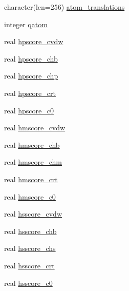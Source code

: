 \begin{DoxyCompactItemize}
\item 
character(len=256) \hyperlink{structcalc__xscore_1_1txinput_a19f91015e53fa0c0f03f9dd9274cdd1c}{atom\-\_\-translations}
\item 
integer \hyperlink{structcalc__xscore_1_1txinput_a4c517e156858f8f15f37b5fd8b74ba9d}{qatom}
\item 
real \hyperlink{structcalc__xscore_1_1txinput_a1a8aa27f6c4649199266216e3827616b}{hpscore\-\_\-cvdw}
\item 
real \hyperlink{structcalc__xscore_1_1txinput_aa4e23b9a9d6c87c204a0673091ba206a}{hpscore\-\_\-chb}
\item 
real \hyperlink{structcalc__xscore_1_1txinput_a4dac3d8d9475dad8dc2dcaa97dd34847}{hpscore\-\_\-chp}
\item 
real \hyperlink{structcalc__xscore_1_1txinput_aa3072ed2745913bfd27a72cbbc1911de}{hpscore\-\_\-crt}
\item 
real \hyperlink{structcalc__xscore_1_1txinput_a0bc75e685f1068470be54d0100b82de9}{hpscore\-\_\-c0}
\item 
real \hyperlink{structcalc__xscore_1_1txinput_ae60bf9cfc4875ca31878b1d299f978f3}{hmscore\-\_\-cvdw}
\item 
real \hyperlink{structcalc__xscore_1_1txinput_aae236f23f94cb7dc7814bc2ada3ba890}{hmscore\-\_\-chb}
\item 
real \hyperlink{structcalc__xscore_1_1txinput_a7972479b4d8b2d06f98b2f358670fdfd}{hmscore\-\_\-chm}
\item 
real \hyperlink{structcalc__xscore_1_1txinput_abe4bd694e897cf1645cb5d9b74832fcb}{hmscore\-\_\-crt}
\item 
real \hyperlink{structcalc__xscore_1_1txinput_a98d87fba290f52c891551d6fbe8b2dbc}{hmscore\-\_\-c0}
\item 
real \hyperlink{structcalc__xscore_1_1txinput_a4459d93ee067a68d028cd230310cd902}{hsscore\-\_\-cvdw}
\item 
real \hyperlink{structcalc__xscore_1_1txinput_a6d4083465725df15ac8f2a4fa525bf78}{hsscore\-\_\-chb}
\item 
real \hyperlink{structcalc__xscore_1_1txinput_aaca06189800791465d6de99c0031656d}{hsscore\-\_\-chs}
\item 
real \hyperlink{structcalc__xscore_1_1txinput_a5e1c85d834d137f1f73b6eea96382688}{hsscore\-\_\-crt}
\item 
real \hyperlink{structcalc__xscore_1_1txinput_a262bca28a47c0dbcf7f0e4324ea17070}{hsscore\-\_\-c0}
\end{DoxyCompactItemize}


